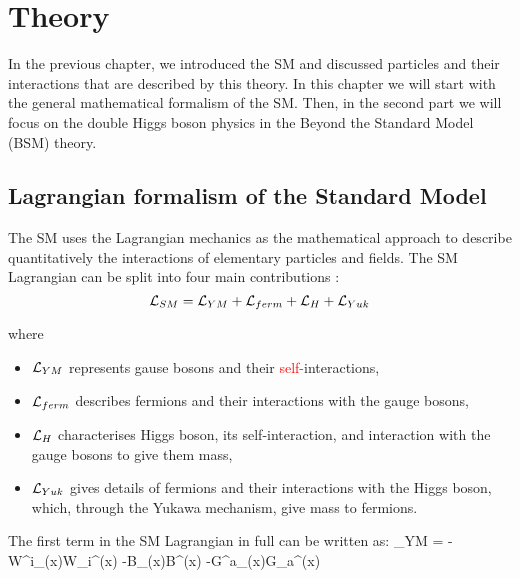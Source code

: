 
\chapter{Theory}
\label{ch:theory}

In the previous chapter, we introduced the SM and discussed particles and their interactions that are described by this theory. In this chapter we will start with the general mathematical formalism of the SM. Then, in the second part we will focus on the double Higgs boson physics in the Beyond the Standard Model (BSM) theory.

\section{Lagrangian formalism of the Standard Model}


\indent The SM uses the Lagrangian mechanics as the mathematical approach to describe quantitatively the interactions of elementary particles and fields. 
The SM Lagrangian can be split into four main contributions \cite{Mozer:2016wzi}:
\begin{equation}\label{lagr_SM}
\mathcal{L}_{SM} = \mathcal{L}_{YM} + \mathcal{L}_{ferm} + \mathcal{L}_{H} + \mathcal{L}_{Yuk} 
\end{equation}

\noindent where

\begin{itemize}
\item $\mathcal{L}_{YM}$ represents gause bosons and their \textcolor{red}{self-}interactions,
\item $\mathcal{L}_{ferm}$ describes fermions and their interactions with the gauge bosons, 
\item $\mathcal{L}_{H}$ characterises Higgs boson, its self-interaction, and interaction with the gauge bosons to give them mass, 
\item $\mathcal{L}_{Yuk} $ gives details of fermions and their interactions with the Higgs boson, which, through the Yukawa mechanism, give mass to fermions.
\end{itemize}
 

The first term in the SM Lagrangian in full can be written as:
\beqn\label{lagr_YM}
\Lagr_{YM} = 	-W^i_{\mu\nu}(x)W_i^{\mu\nu}(x) -B_{\mu\nu}(x)B^{\mu\nu}(x) -G^a_{\mu\nu}(x)G_a^{\mu\nu}(x)
\eeqn


